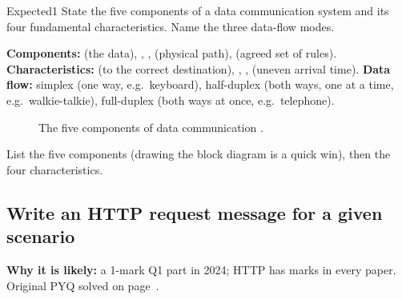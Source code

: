 \begin{question}{Expected}{1}
State the five components of a data communication system and its four fundamental characteristics. Name the three data-flow modes.
\end{question}
\begin{solution}
\textbf{Components:}  (the data), , ,  (physical path),  (agreed set of rules).
\textbf{Characteristics:}  (to the correct destination), , ,  (uneven arrival time).
\textbf{Data flow:} simplex (one way, e.g.\ keyboard), half-duplex (both ways, one at a time, e.g.\ walkie-talkie), full-duplex (both ways at once, e.g.\ telephone).
\end{solution}
\begin{figure}[H]\centering
{}
\caption{The five components of data communication .}\end{figure}
\begin{answerplan}[1 mark]
List the five components (drawing the block diagram is a quick win), then the four characteristics.
\end{answerplan}

\subsection{Write an HTTP request message for a given scenario}\label{iq:C13}
    

\textbf{Why it is likely:} a 1-mark Q1 part in 2024; HTTP has marks in every paper. Original PYQ solved on page~\pageref{q:MS2024-1d}.

